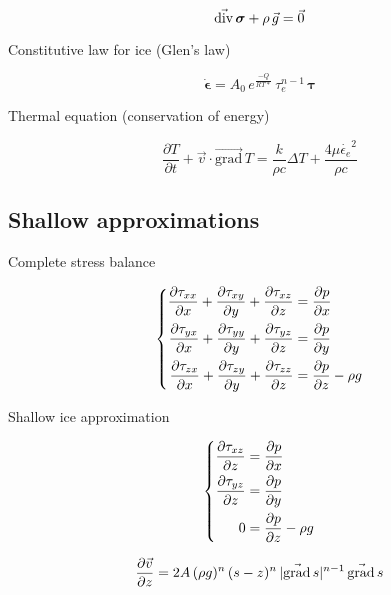 \documentclass{article}
\renewcommand{\grad}[1]{\vec{\textup{grad}}\,#1}
\newcommand{\tensdiv}[1]{\vec{\textup{div}}\,#1}
\begin{document}
\begin{equation}
    \label{eq:stresses}
    \tensdiv{\bm\sigma} + \rho\,\vec{g} = \vec{0}
\end{equation}

Constitutive law for ice (Glen's law)

\begin{equation}
    \bm{\dot\epsilon} = A_0\,e^\frac{-Q}{RT*}\,\tau_e^{n-1}\,\bm{\tau}
\end{equation}

Thermal equation (conservation of energy)

\begin{equation}
    \frac{\partial T}{\partial t}
        + \vec{v} \cdot \vec{\mathrm{grad}}\,T
        = \frac{k}{\rho c} \Delta T
        + \frac{4\mu \dot{\epsilon_e}^2}{\rho c}
\end{equation}

\subsection{Shallow approximations}

Complete stress balance

\begin{equation}
    \left\{\begin{aligned}
        \pdv{\tau_{xx}}{x} + \pdv{\tau_{xy}}{y} + \pdv{\tau_{xz}}{z}
            &= \pdv{p}{x} \\
        \pdv{\tau_{yx}}{x} + \pdv{\tau_{yy}}{y} + \pdv{\tau_{yz}}{z}
            &= \pdv{p}{y} \\
        \pdv{\tau_{zx}}{x} + \pdv{\tau_{zy}}{y} + \pdv{\tau_{zz}}{z}
            &= \pdv{p}{z} - \rho g
    \end{aligned}\right.
\end{equation}

Shallow ice approximation

\begin{equation}
    \left\{\begin{aligned}
        \pdv{\tau_{xz}}{z} &= \pdv{p}{x} \\
        \pdv{\tau_{yz}}{z} &= \pdv{p}{y} \\
        0 &= \pdv{p}{z} - \rho g
    \end{aligned}\right.
\end{equation}


\begin{equation}
    \pdv{\vec{v}}{z} = 2A\,(\rho g)^n\,(s-z)^n\,|\grad{s}|^{n-1}\,\grad{s}
\end{equation}
\end{document}
